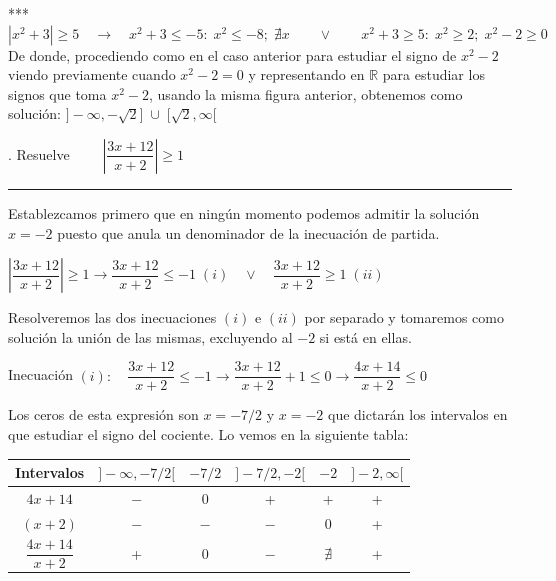 \begin{miejercicio}
\vspace{-4mm}  *** $|x^2+3|\ge 5 \quad \to \quad x^2+3\le -5: \; x^2\le -8; \; \nexists x \qquad  \vee \qquad  x^2+3\ge 5: \; x^2\ge 2; \; x^2-2\ge 0$ De donde, procediendo como en el caso anterior para estudiar el signo de $x^2-2$ viendo previamente cuando $x^2-2=0$ y representando en $\mathbb R$ para estudiar los signos que toma $x^2-2$, usando la misma figura anterior, obtenemos como solución: $]-\infty, -\sqrt 2]\; \cup \; [\sqrt 2, \infty[$
\end{miejercicio}


\begin{miejercicio}
	. Resuelve $\qquad \left| \dfrac {3x+12}{x+2} \right| \ge 1$

\rule{250pt}{0.1pt}
		
\vspace{5mm} Establezcamos primero que en ningún momento podemos admitir la solución $x=-2$ puesto que anula un denominador de la inecuación de partida.
			
\vspace{2mm} $\left| \dfrac {3x+12}{x+2} \right| \ge 1 \to \dfrac {3x+12}{x+2} \le -1 \; (i)\quad \vee \quad \dfrac {3x+12}{x+2} \ge 1 \; (ii)$
			
\vspace{2mm} Resolveremos las dos inecuaciones $(i)$ e $(ii)$ por separado y tomaremos como solución la unión de las mismas, excluyendo al $-2$ si está en ellas.
 
 \vspace{2mm} Inecuación $(i): \quad \dfrac {3x+12}{x+2} \le -1 \to \dfrac {3x+12}{x+2} +1\le 0 \to \dfrac {4x+14}{x+2} \le 0$		
 			
 \vspace{2mm} Los ceros de esta expresión son $x=-7/2$ y $x=-2$ que dictarán los intervalos en que estudiar el signo del cociente. Lo vemos en la siguiente tabla:
 					
 			\begin{table}[H]
 			\centering
			\begin{tabular}{|c|c|c|c|c|c|}
			\hline
 			Intervalos&$]-\infty,-7/2[$  &$-7/2$  &$]-7/2,-2[$  & $-2$ &$]-2,\infty[$ \\ \hline
 			$4x+14$& $-$ & 0 & + &+  & +\\ \hline
 			$(x+2)$& $-$ & $-$  & $-$  &0  & +\\ \hline
 			$\dfrac {4x+14}{x+2}$& + & 0 & $-$ & $\nexists$ & +\\ \hline
			\end{tabular}
			\end{table}
			

\end{miejercicio}

